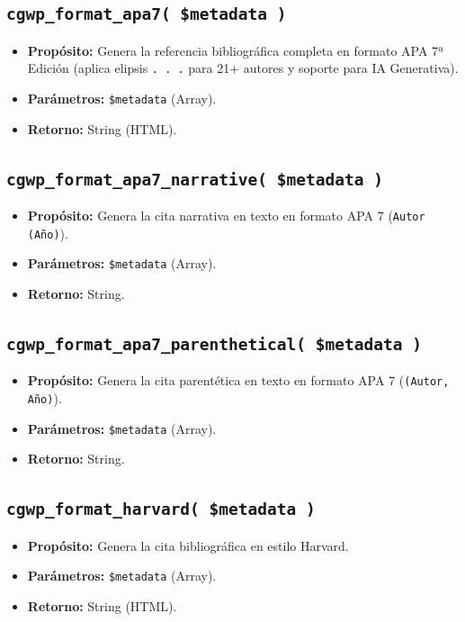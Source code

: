 \documentclass[11pt, a4paper]{article}
\begin{document}
\subsection{\texttt{cgwp\_format\_apa7( \$metadata )}}
\begin{itemize}
\item \textbf{Propósito:} Genera la referencia bibliográfica completa en formato APA 7ª Edición (aplica elipsis \texttt{. . .} para 21+ autores y soporte para IA Generativa).
\item \textbf{Parámetros:} \texttt{\$metadata} (Array).
\item \textbf{Retorno:} String (HTML).
\end{itemize}
\subsection{\texttt{cgwp\_format\_apa7\_narrative( \$metadata )}}
\begin{itemize}
\item \textbf{Propósito:} Genera la cita narrativa en texto en formato APA 7 (\texttt{Autor (Año)}).
\item \textbf{Parámetros:} \texttt{\$metadata} (Array).
\item \textbf{Retorno:} String.
\end{itemize}
\subsection{\texttt{cgwp\_format\_apa7\_parenthetical( \$metadata )}}
\begin{itemize}
\item \textbf{Propósito:} Genera la cita parentética en texto en formato APA 7 (\texttt{(Autor, Año)}).
\item \textbf{Parámetros:} \texttt{\$metadata} (Array).
\item \textbf{Retorno:} String.
\end{itemize}
\subsection{\texttt{cgwp\_format\_harvard( \$metadata )}}
\begin{itemize}
\item \textbf{Propósito:} Genera la cita bibliográfica en estilo Harvard.
\item \textbf{Parámetros:} \texttt{\$metadata} (Array).
\item \textbf{Retorno:} String (HTML).
\end{itemize}
\end{document}
